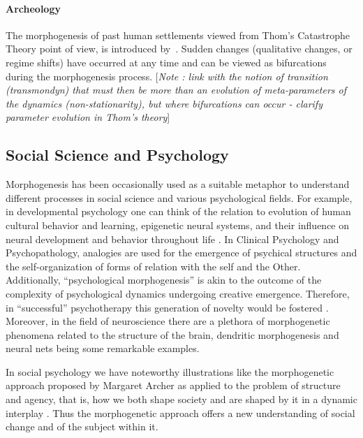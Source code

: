 \documentclass[fleqn,10pt]{wlscirep}
\begin{document}
\paragraph{Archeology}

The morphogenesis of past human settlements viewed from Thom's Catastrophe Theory point of view, is introduced by~\cite{renfrew1978trajectory}. Sudden changes (qualitative changes, or regime shifts) have occurred at any time and can be viewed as bifurcations during the morphogenesis process. [\textit{Note : link with the notion of transition (transmondyn) that must then be more than an evolution of meta-parameters of the dynamics (non-stationarity), but where bifurcations can occur - clarify parameter evolution in Thom's theory}]




\subsection*{Social Science and Psychology}


Morphogenesis has been occasionally used as a suitable metaphor to understand different processes in social science and various psychological fields. For example, in developmental psychology one can think of the relation to evolution of human cultural behavior and learning, epigenetic neural systems, and their influence on neural development and behavior throughout life \cite{hart_held_2013}. In Clinical Psychology and Psychopathology, analogies are used for the emergence of psychical structures and the self-organization of forms of relation with the self and the Other. Additionally, “psychological morphogenesis” is akin to the outcome of the complexity of psychological dynamics undergoing creative emergence. Therefore, in “successful” psychotherapy this generation of novelty would be fostered \cite{piers_self-organizing_2007}. Moreover, in the field of neuroscience there are a plethora of morphogenetic phenomena related to the structure of the brain, dendritic morphogenesis and neural nets being some remarkable examples.\cite{_issues_2013}

In social psychology we have noteworthy illustrations like the morphogenetic approach proposed by Margaret Archer as applied to the problem of structure and agency, that is, how we both shape society and are shaped by it in a dynamic interplay \cite{archer_margaret_1999}. Thus the morphogenetic approach offers a new understanding of social change and of the subject within it.  
\end{document}
